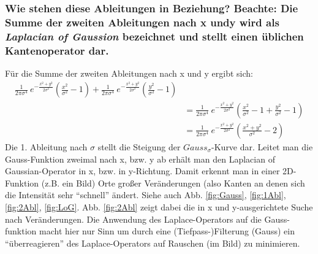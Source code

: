 \subsubsection*{Wie stehen diese Ableitungen in Beziehung? Beachte: Die Summe der zweiten Ableitungen nach x undy wird als \emph{Laplacian of Gaussion} bezeichnet und stellt einen \"ublichen Kantenoperator dar.}

F\"ur die Summe der zweiten Ableitungen nach x und y ergibt sich:
\begin{align*}
\frac{1}{2 \pi \sigma^4}~e^{-\frac{x^2 + y^2}{2 \sigma^2}} (\frac{x^2}{\sigma^2} - 1) + \frac{1}{2 \pi \sigma^4}~e^{-\frac{x^2 + y^2}{2 \sigma^2}} (\frac{y^2}{\sigma^2} - 1)\\
&= \frac{1}{2 \pi \sigma^4}~e^{-\frac{x^2 + y^2}{2 \sigma^2}} (\frac{x^2}{\sigma^2} - 1 + \frac{y^2}{\sigma^2} - 1)\\
&= \frac{1}{2 \pi \sigma^4}~e^{-\frac{x^2 + y^2}{2 \sigma^2}} (\frac{x^2 + y^2}{\sigma^2} - 2)
\end{align*}
Die 1. Ableitung nach $\sigma$ stellt die Steigung der $Gauss_{\sigma}$-Kurve dar. Leitet man die Gauss-Funktion zweimal nach x, bzw. y ab erh\"alt man den Laplacian of Gaussian-Operator in x, bzw. in y-Richtung.
Damit erkennt man in einer 2D-Funktion (z.B. ein Bild) Orte gro{\ss}er Ver\"anderungen (also Kanten an denen sich die Intensit\"at sehr ``schnell'' \"andert.
Siehe auch Abb. \ref{fig:Gauss}, \ref{fig:1Abl}, \ref{fig:2Abl}, \ref{fig:LoG}.
Abb. \ref{fig:2Abl} zeigt dabei die in x und y-ausgerichtete Suche nach Ver\"anderungen. Die Anwendung des  Laplace-Operators auf die Gauss-funktion macht hier nur Sinn um durch eine (Tiefpass-)Filterung (Gauss) ein ``\"uberreagieren'' des Laplace-Operators auf Rauschen (im Bild) zu minimieren.

